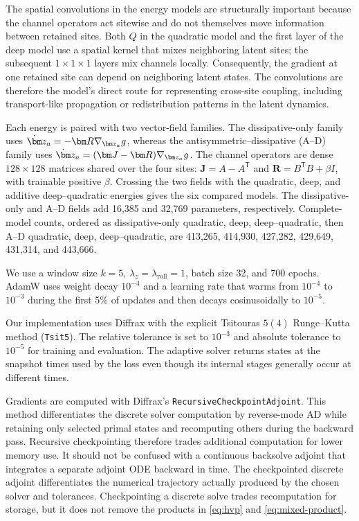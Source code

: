 \documentclass[a4paper,11pt]{article}
\newcommand{\z}{\bm z}
\newcommand{\Jop}{\bm J}
\newcommand{\Rop}{\bm R}
\begin{document}
The spatial convolutions in the energy models are structurally important because the channel operators act sitewise and do not themselves move information between retained sites. Both $Q$ in the quadratic model and the first layer of the deep model use a spatial kernel that mixes neighboring latent sites; the subsequent $1\times1\times1$ layers mix channels locally. Consequently, the gradient at one retained site can depend on neighboring latent states. The convolutions are therefore the model's direct route for representing cross-site coupling, including transport-like propagation or redistribution patterns in the latent dynamics. 

Each energy is paired with two vector-field families. The dissipative-only family uses $\dot\z_a=-\Rop\nabla_{\z_a}g$, whereas the antisymmetric--dissipative (A--D) family uses $\dot\z_a=(\Jop-\Rop)\nabla_{\z_a}g$. The channel operators are dense $128\times128$ matrices shared over the four sites: $\Jop=A-A^{\mathsf T}$ and $\Rop=B^{\mathsf T}B+\beta I$, with trainable positive $\beta$. Crossing the two fields with the quadratic, deep, and additive deep--quadratic energies gives the six compared models. The dissipative-only and A--D fields add 16,385 and 32,769 parameters, respectively. Complete-model counts, ordered as dissipative-only quadratic, deep, deep--quadratic, then A--D quadratic, deep, deep--quadratic, are 413,265, 414,930, 427,282, 429,649, 431,314, and 443,666.

We use a window size $k=5$, $\lambda_z=\lambda_{\mathrm{roll}}=1$, batch size 32, and 700 epochs. AdamW uses weight decay $10^{-4}$ and a learning rate that warms from $10^{-4}$ to $10^{-3}$ during the first 5\% of updates and then decays cosinusoidally to $10^{-5}$. 

Our implementation uses Diffrax \cite{kidger2021neural} with the explicit
Tsitouras $5(4)$ Runge--Kutta method (\texttt{Tsit5}). The relative tolerance is set to $10^{-3}$ and absolute tolerance to $10^{-5}$ for training and evaluation. The adaptive solver returns states at the snapshot times used by the loss even though its internal stages generally occur at different times.

Gradients are computed with Diffrax's \texttt{RecursiveCheckpointAdjoint}. This method differentiates the discrete solver computation by reverse-mode AD while retaining only selected primal states and recomputing others during the backward pass. Recursive checkpointing therefore trades additional computation for lower memory use. It should not be confused with a continuous backsolve adjoint that integrates a separate adjoint ODE backward in time. The checkpointed discrete adjoint differentiates the numerical trajectory actually produced by the chosen solver and tolerances. Checkpointing a discrete solve trades recomputation for storage, but it does not remove the products in \eqref{eq:hvp} and \eqref{eq:mixed-product}.
\end{document}

